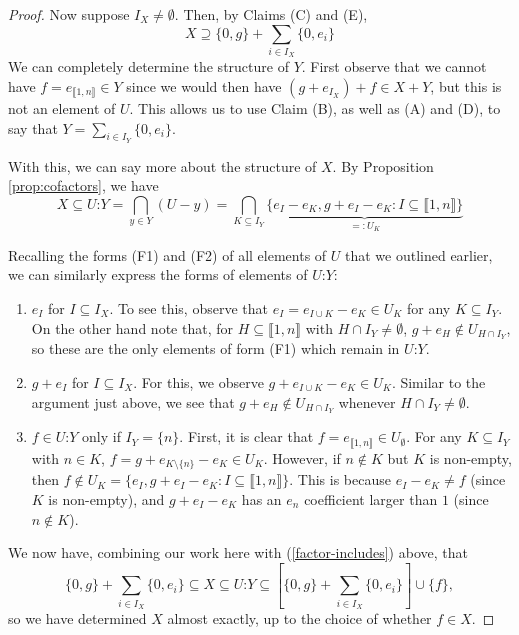 \documentclass{report}
\newcommand{\llb}{\llbracket}
\newcommand{\rrb}{\rrbracket}
\renewcommand{\:}{\text{:}}
\theoremstyle{definition}
\begin{document}
\begin{proof}
Now suppose $I_X \neq \emptyset$.
Then, by Claims (C) and (E), 
\[X \supseteq \{0,g\} + \sum_{i\in I_X} \{0,e_i\} \tag{1} \label{factor-includes} \]
We can completely determine the structure of $Y$.
First observe that we cannot have $f=e_{\llb1,n\rrb}\in Y$ since we would then have $(g+e_{I_X})+f \in X+Y$, but this is not an element of $U$.
This allows us to use Claim (B), as well as (A) and (D), to say that $Y = \sum_{i\in I_Y} \{0,e_i\}$.

With this, we can say more about the structure of $X$.
By Proposition \ref{prop:cofactors}, we have 
\[X \subseteq U\:Y = \bigcap_{y\in Y}(U-y) = \bigcap_{K\subseteq I_Y} \underbrace{\{e_I - e_K, g+e_I - e_K : I\subseteq \llb 1,n \rrb \}}_{=:U_K} \]

Recalling the forms (F1) and (F2) of all elements of $U$ that we outlined earlier, we can similarly express the forms of elements of $U\:Y$:
\begin{enumerate}[(F1$'$)]
\item $e_I$ for $I\subseteq I_X$. 
To see this, observe that $e_I = e_{I\cup K}-e_K\in U_K$ for any $K\subseteq I_Y$.
On the other hand note that, for $H \subseteq \llb 1,n \rrb$ with $H\cap I_Y\neq \emptyset$, $g+e_H\notin U_{H\cap I_Y}$, so these are the only elements of form (F1) which remain in $U\:Y$.
%
\item $g+e_I$ for $I\subseteq I_X$.
For this, we observe $g+e_{I\cup K} - e_K\in U_K$. 
Similar to the argument just above, we see that $g+e_H\notin U_{H\cap I_Y}$ whenever $H\cap I_Y\neq\emptyset$.
\item $f\in U\:Y$ only if $I_Y = \{n\}$.
First, it is clear that $f = e_{\llb 1,n \rrb} \in U_\emptyset$.
For any $K\subseteq I_Y$ with $n\in K$, $f = g+ e_{K\setminus\{n\}} - e_K\in U_K$.
However, if $n\notin K$ but $K$ is non-empty, then $f\notin U_K = \{e_I, g+e_I-e_K: I\subseteq \llb1,n\rrb\}$.
This is because $e_I - e_K \neq f$ (since $K$ is non-empty), and $g+e_I-e_K$ has an $e_n$ coefficient larger than $1$ (since $n\notin K$).
\end{enumerate}
We now have, combining our work here with (\ref{factor-includes}) above, that
\[ \{0,g\} + \sum_{i\in I_X}\{0,e_i\} \subseteq X \subseteq U\:Y \subseteq \left[\{0,g\}+\sum_{i\in I_X} \{0,e_i\} \right]\cup\{f\},\]
so we have determined $X$ almost exactly, up to the choice of whether $f\in X$.


\end{proof}
\end{document}
